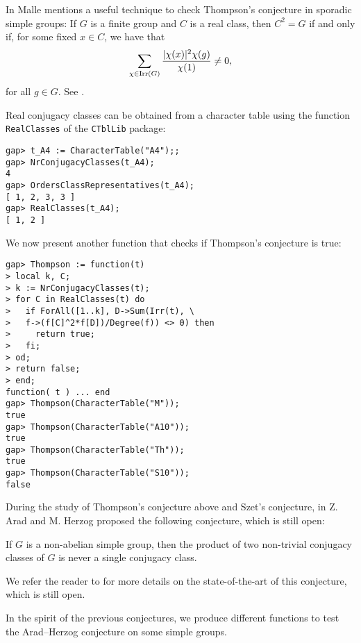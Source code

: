 \begin{example}
    In \cite{MR3289286} 
    Malle mentions a useful technique 
    to check Thompson's conjecture in sporadic simple groups: If $G$
    is a finite group and $C$ is a real class, then
    $C^2=G$ if and only if, for some fixed $x\in C$, we have that
    \[
        \sum_{\chi\in\operatorname{Irr}(G)}\frac{|\chi(x)|^2\chi(g)}{\chi(1)}\ne0,
    \]
    for all $g\in G$. 
    See \cite[Exercise 2.6.3]{MR2680716}. 
    
    Real conjugacy classes 
    can be obtained from a character table
    using the function \lstinline{RealClasses} of the \lstinline{CTblLib} package:
\begin{lstlisting}
gap> t_A4 := CharacterTable("A4");;
gap> NrConjugacyClasses(t_A4);
4
gap> OrdersClassRepresentatives(t_A4);
[ 1, 2, 3, 3 ]
gap> RealClasses(t_A4);
[ 1, 2 ]
\end{lstlisting}
    We now present another function that checks
    if Thompson's conjecture is true:
\begin{lstlisting}
gap> Thompson := function(t)
> local k, C;
> k := NrConjugacyClasses(t);
> for C in RealClasses(t) do
>   if ForAll([1..k], D->Sum(Irr(t), \ 
>   f->(f[C]^2*f[D])/Degree(f)) <> 0) then
>     return true;
>   fi;
> od;
> return false;
> end;
function( t ) ... end
gap> Thompson(CharacterTable("M"));
true
gap> Thompson(CharacterTable("A10"));
true
gap> Thompson(CharacterTable("Th"));
true
gap> Thompson(CharacterTable("S10"));
false
\end{lstlisting}
\end{example}

During the study of Thompson's conjecture above and Szet's conjecture, in \cite{MR783067} Z. Arad and M. Herzog proposed the following conjecture, which is still open:

\begin{conjecture}
\label{conj:AradHerzog}
If $G$ is a non-abelian simple group, then 
the product of two non-trivial conjugacy classes of $G$ 
is never a single conjugacy class. 
\end{conjecture}

We refer the reader to \cite{MR3003939} for more details on the state-of-the-art of this conjecture, which is still open.

In the spirit of the previous conjectures, we produce different functions to test the Arad--Herzog conjecture on some simple groups.

